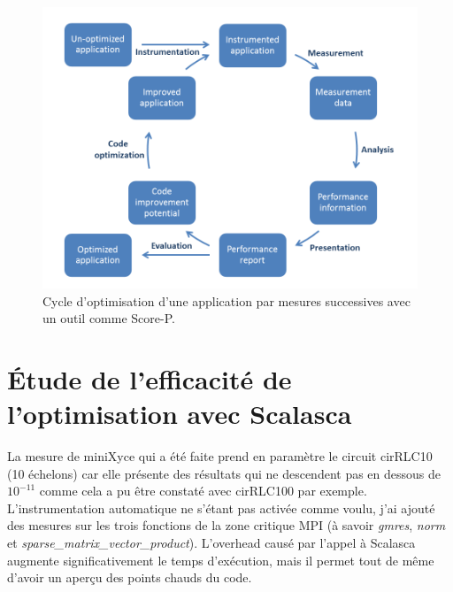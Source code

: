 \documentclass[11pt,a4paper,oneside]{memoir}
\theoremstyle{definition}
\theoremstyle{remark}
\theoremstyle{plain}
\begin{document}
\begin{figure}
\begin{center}
\includegraphics[scale=0.4]{Images-Rapport/perf-opt-cycle.png}
\caption{Cycle d'optimisation d'une application par mesures successives avec un outil comme Score-P. \cite{score-p-doc}}
\label{schéma_scorep_opti}
\end{center}
\end{figure}


\section{\'Etude de l'efficacité de l'optimisation avec Scalasca}

La mesure de miniXyce qui a été faite prend en paramètre le circuit cirRLC10 (10 échelons) car elle présente des résultats qui ne descendent pas en dessous de $10^{-11}$ comme cela a pu être constaté avec cirRLC100 par exemple. L'instrumentation automatique ne s'étant pas activée comme voulu, j'ai ajouté des mesures sur les trois fonctions de la zone critique MPI (à savoir \textit{gmres}, \textit{norm} et \textit{sparse\_matrix\_vector\_product}). L'overhead causé par l'appel à Scalasca augmente significativement le temps d'exécution, mais il permet tout de même d'avoir un aperçu des points chauds du code.\bigskip
\end{document}
